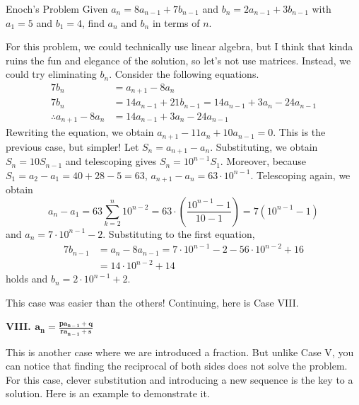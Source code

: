 \documentclass[../../../main.tex]{subfiles}
\begin{document}
\begin{problem}{Enoch's Problem}{}
Given $a_n = 8a_{n-1} + 7b_{n-1}$ and $b_n = 2a_{n-1} + 3b_{n-1}$ with
$a_1 = 5$ and $b_1 = 4$, find $a_n$ and $b_n$ in terms of $n$.
\end{problem}
\begin{solution}
For this problem, we could technically use linear algebra,
but I think that kinda ruins the fun and elegance of the solution,
so let's not use matrices. Instead, we could try eliminating $b_n$.
Consider the following equations.
\begin{align*}
    7b_n &= a_{n+1} - 8a_n \\
    7b_n &= 14 a_{n-1} + 21 b_{n-1}
          = 14 a_{n-1} + 3a_n - 24a_{n-1} \\
    \therefore
    a_{n+1} - 8a_n &= 14 a_{n-1} + 3a_n - 24a_{n-1}
\end{align*}
Rewriting the equation, we obtain $a_{n+1} - 11a_n + 10 a_{n-1} = 0$.
This is the previous case, but simpler! Let $S_n = a_{n+1} - a_n$.
Substituting, we obtain $S_n = 10 S_{n-1}$ and telescoping gives
$S_n = 10^{n-1} S_1$. Moreover, because $S_1 = a_2 - a_1 = 40 + 28 - 5
= 63$, $a_{n+1} - a_n = 63 \cdot 10^{n-1}$. Telescoping again,
we obtain
\[
a_n - a_1
= 63 \sum_{k=2}^n 10^{n-2}
= 63 \cdot \left( \frac{10^{n-1} - 1}{10 - 1} \right)
= 7 (10^{n-1} - 1)
\]
and $a_n = 7 \cdot 10^{n-1} - 2$. Substituting to the first equation,
\begin{align*}
    7b_{n-1}
    &= a_n - 8a_{n-1}
    = 7 \cdot 10^{n-1} - 2 - 56 \cdot 10^{n-2} + 16 \\
    &= 14 \cdot 10^{n-2} + 14
\end{align*}
holds and $b_n = 2 \cdot 10^{n-1} + 2$.
\end{solution}

This case was easier than the others! Continuing, here is Case VIII.

{\Large\textcolor{BrickRed}
{\textbf{VIII. $\mathbf{a_n = \frac{p a_{n-1} + q}{r a_{n-1} + s}}$}}}

This is another case where we are introduced a fraction. But unlike
Case V, you can notice that finding the reciprocal of both sides
does not solve the problem. For this case, clever substitution
and introducing a new sequence is the key to a solution. Here is an
example to demonstrate it.
\end{document}
